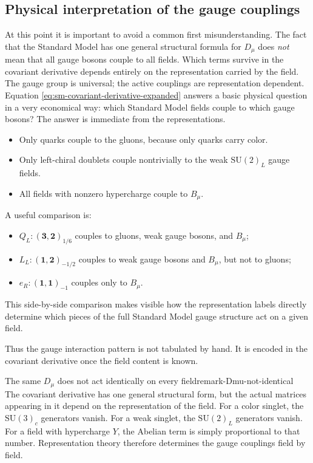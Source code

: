 \documentclass[11pt,a4paper]{article}
\newcommand{\SUc}{\mathrm{SU}(3)_c}
\newcommand{\SUw}{\mathrm{SU}(2)_L}
\begin{document}
\subsection{Physical interpretation of the gauge couplings}


At this point it is important to avoid a common first misunderstanding. The fact that the Standard Model has one general structural formula for \(D_\mu\) does \emph{not} mean that all gauge bosons couple to all fields. Which terms survive in the covariant derivative depends entirely on the representation carried by the field. The gauge group is universal; the active couplings are representation dependent. 
Equation \eqref{eq:sm-covariant-derivative-expanded} answers a basic physical question in a very economical way: which Standard Model fields couple to which gauge bosons? The answer is immediate from the representations.
\begin{itemize}[leftmargin=1.7em]
\item Only quarks couple to the gluons, because only quarks carry color.
\item Only left-chiral doublets couple nontrivially to the weak \(\SUw\) gauge fields.
\item All fields with nonzero hypercharge couple to \(B_\mu\).
\end{itemize}

A useful comparison is:
\begin{itemize}[leftmargin=1.7em]
\item \(Q_L:(\mathbf{3},\mathbf{2})_{1/6}\) couples to gluons, weak gauge bosons, and \(B_\mu\);
\item \(L_L:(\mathbf{1},\mathbf{2})_{-1/2}\) couples to weak gauge bosons and \(B_\mu\), but not to gluons;
\item \(e_R:(\mathbf{1},\mathbf{1})_{-1}\) couples only to \(B_\mu\).
\end{itemize}
This side-by-side comparison makes visible how the representation labels directly determine which pieces of the full Standard Model gauge structure act on a given field.

Thus the gauge interaction pattern is not tabulated by hand. It is encoded in the covariant derivative once the field content is known.

\begin{remarkbox}{The same \texorpdfstring{$D_\mu$}{Dmu} does not act identically on every field}{remark-Dmu-not-identical}
The covariant derivative has one general structural form, but the actual matrices appearing in it depend on the representation of the field. For a color singlet, the \(\SUc\) generators vanish. For a weak singlet, the \(\SUw\) generators vanish. For a field with hypercharge \(Y\), the Abelian term is simply proportional to that number. Representation theory therefore determines the gauge couplings field by field.
\end{remarkbox}
\end{document}
